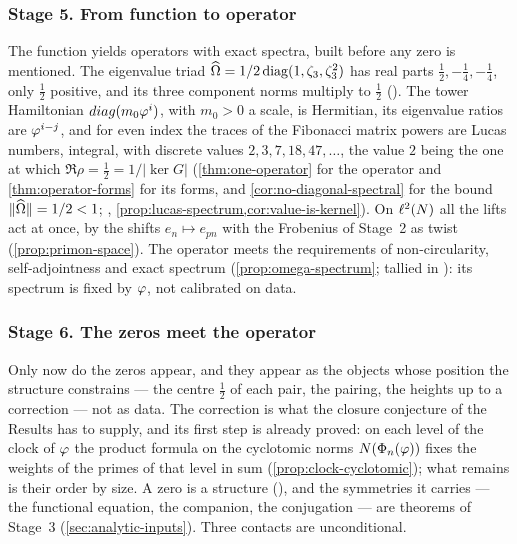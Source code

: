 \subsubsection{Stage 5. From function to operator}\label{ssec:stage5}

The function yields operators with exact spectra, built before any zero is mentioned.
The eigenvalue triad $\widehat{\Omega}=1/2\operatorname{diag}(1,\zeta_3,\zeta_3^2)$ has
real parts $\tfrac12,-\tfrac14,-\tfrac14$, only $\tfrac12$ positive, and its three
component norms multiply to $\tfrac12$ ().  The tower Hamiltonian $diag(m_0\varphi^{i})$, with $m_0>0$ a scale, is Hermitian, its eigenvalue ratios are
$\varphi^{i-j}$, and for even index the traces of the Fibonacci matrix powers are
Lucas numbers, integral, with discrete values $2,3,7,18,47,\dots$, the value $2$
being the one at which $\Re\rho=\tfrac12=1/|\ker G|$ (\cref{thm:one-operator} for the operator and \cref{thm:operator-forms} for its forms, and \cref{cor:no-diagonal-spectral} for the bound $\|\widehat{\Omega}\|=1/2<1$;
,
\cref{prop:lucas-spectrum,cor:value-is-kernel}).  On $\ell^2(N)$ all the lifts act at
once, by the shifts $e_n\mapsto e_{pn}$ with the Frobenius of Stage~2 as twist
(\cref{prop:primon-space}).  The operator meets the requirements of
non-circularity, self-adjointness and exact spectrum
(\cref{prop:omega-spectrum}; tallied in ): its spectrum is
fixed by $\varphi$, not calibrated on data.

\subsubsection{Stage 6. The zeros meet the operator}\label{ssec:stage6}

Only now do the zeros appear, and they appear as the objects whose position the structure constrains --- the centre $\tfrac12$ of each pair, the pairing, the heights up to a correction --- not as data.  The correction is what the closure conjecture of the
Results has to supply, and its first step is already proved: on each level of the clock of $\varphi$ the product
formula on the cyclotomic norms $N(\Phi_n(\varphi))$ fixes the weights of the primes of that level
in sum (\cref{prop:clock-cyclotomic}); what remains is their order by size.  A zero is a structure (),
and the symmetries it carries --- the functional equation, the companion, the
conjugation --- are theorems of Stage~3 (\cref{sec:analytic-inputs}).  Three
contacts are unconditional.

